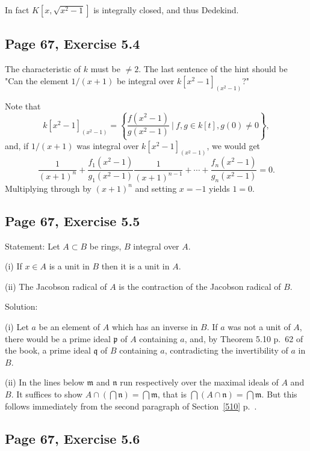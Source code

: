 \documentclass[parskip=half,fontsize=12pt]{scrartcl}%
\newcommand{\mf}{\mathfrak}
\newcommand{\mmm}{\mf m}
\newcommand{\nnn}{\mf n}
\newcommand{\ppp}{\mf p}
\newcommand{\qqq}{\mf q}
\begin{document}
In fact $K\left[x,\sqrt{x^2-1}\right]$ is integrally closed, and thus Dedekind.


\subsection{Page 67, Exercise 5.4}%

The characteristic of $k$ must be $\ne2$. The last sentence of the hint should be "Can the element $1/(x + 1)$ be integral over $k[x^2-1]_{(x^2-1)}$?" 

Note that 
$$
k[x^2-1]_{(x^2-1)}=\left\{\frac{f(x^2-1)}{g(x^2-1)}\ \bigg|\ f,g\in k[t],g(0)\ne0\right\},
$$ 
and, if $1/(x + 1)$ was integral over $k[x^2-1]_{(x^2-1)}$, we would get 
$$
\frac1{(x+1)^n}+\frac{f_1(x^2-1)}{g_1(x^2-1)}\frac1{(x+1)^{n-1}}+\cdots+\frac{f_n(x^2-1)}{g_n(x^2-1)}=0.
$$ 
Multiplying through by $(x+1)^n$ and setting $x=-1$ yields $1=0$. 

\subsection{Page 67, Exercise 5.5}\label{55}%

Statement: Let $A\subset B$ be rings, $B$ integral over $A$.

(i) If $x\in A$ is a unit in $B$ then it is a unit in $A$.

(ii) The Jacobson radical of $A$ is the contraction of the Jacobson radical of $B$. 

Solution: 

(i) Let $a$ be an element of $A$ which has an inverse in $B$. If $a$ was not a unit of $A$, there would be a prime ideal $\ppp$ %
of $A$ containing $a$, and, by Theorem 5.10 p.~62 of the book, a prime ideal $\qqq$ of $B$ containing $a$, %
contradicting the invertibility of $a$ in $B$. 

(ii) In the lines below $\mmm$ and $\nnn$ run respectively over the maximal ideals of $A$ and $B$. It suffices to show $A\cap(\bigcap\nnn)=\bigcap\mmm$, that is $\bigcap(A\cap\nnn)=\bigcap\mmm$. But this follows immediately from the second paragraph of Section~\ref{510} p.~\pageref{510}. 

\subsection{Page 67, Exercise 5.6}%
\end{document}
